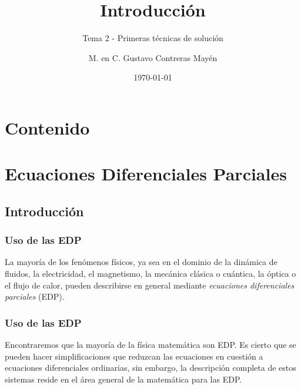 
\title{\large{Introducción}}
\subtitle{Tema 2 - Primeras técnicas de solución}
\author{M. en C. Gustavo Contreras Mayén}
\date{\today}

\maketitle
\fontsize{14}{14}\selectfont
{}
\section*{Contenido}
\section{Ecuaciones Diferenciales Parciales}
\subsection{Introducción}
\begin{frame}
\frametitle{Uso de las EDP}
La mayoría de los fenómenos físicos, ya sea en el dominio de la dinámica de fluidos, la electricidad, el magnetismo, la mecánica clásica o cuántica, la óptica o el flujo de calor, pueden describirse en general mediante \emph{ecuaciones diferenciales parciales} (EDP).
\end{frame}
\begin{frame}
\frametitle{Uso de las EDP}
Encontraremos que la mayoría de la física matemática son EDP. Es cierto que se pueden hacer simplificaciones que reduzcan las ecuaciones en cuestión a ecuaciones diferenciales ordinarias, sin embargo, la descripción completa de estos sistemas reside en el área general de la matemática para las EDP.
\end{frame}
